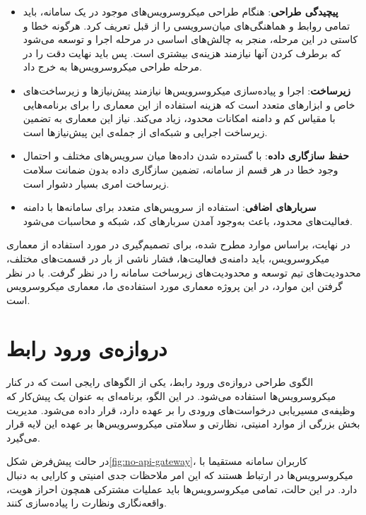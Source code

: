 \begin{itemize}
	 \item \textbf{پیچیدگی طراحی}: هنگام طراحی میکروسرویس‌های موجود در یک سامانه، باید تمامی روابط و هماهنگی‌های میان‌سرویسی را از قبل تعریف کرد. هرگونه خطا و کاستی در این مرحله، منجر به چالش‌های اساسی در مرحله اجرا و توسعه می‌شود که برطرف کردن آنها نیازمند هزینه‌ی بیشتری است. پس باید نهایت دقت را در مرحله طراحی میکروسرویس‌ها به خرج داد.
	
	 \item \textbf{زیرساخت}: اجرا و پیاده‌سازی میکروسرویس‌ها نیازمند پیش‌نیاز‌ها و زیرساخت‌های خاص و ابزار‌های متعدد است که هزینه استفاده از این معماری را برای برنامه‌هایی با مقیاس کم و دامنه امکانات محدود، زیاد می‌کند. نیاز این معماری به تضمین زیرساخت اجرایی و شبکه‌ای از جمله‌ی این پیش‌نیازها است.
	
	 \item \textbf{حفظ سازگاری داده}: با گسترده شدن داده‌ها میان سرویس‌های مختلف و احتمال وجود خطا در هر قسم از سامانه، تضمین سازگاری داده بدون ضمانت سلامت زیرساخت امری بسیار دشوار است.
	
	 \item \textbf{سربارهای اضافی}: استفاده از سرویس‌های متعدد برای سامانه‌ها با دامنه فعالیت‌های محدود، باعث به‌وجود آمدن سربار‌های کد، شبکه و محاسبات می‌شود.
\end{itemize}

در نهایت، براساس موارد مطرح شده، برای تصمیم‌گیری در مورد استفاده از معماری میکروسرویس، باید دامنه‌ی فعالیت‌ها، فشار ناشی از بار در قسمت‌های مختلف، محدودیت‌های تیم توسعه و محدودیت‌های زیرساخت سامانه را در نظر گرفت. با در نظر گرفتن این موارد، در این پروژه معماری مورد استفاده‌ی ما، معماری میکروسرویس است.

\section{‌دروازه‌ی ورود رابط}
الگوی طراحی ‌دروازه‌ی ورود رابط، یکی از الگوهای رایجی است که در کنار میکروسرویس‌ها استفاده می‌شود. در این الگو، برنامه‌ای به عنوان یک پیش‌کار که وظیفه‌ی مسیریابی درخواست‌های ورودی را بر عهده دارد، قرار داده می‌شود. مدیریت بخش بزرگی از موارد امنیتی، نظارتی و سلامتی میکروسرویس‌ها بر عهده این لایه قرار می‌گیرد.

در حالت پیش‌فرض شکل\ref{fig:no-api-gateway}، کاربران سامانه مستقیما با میکروسرویس‌ها در ارتباط هستند که این امر ملاحظات جدی امنیتی و کارایی به دنبال دارد. در این حالت، تمامی میکروسرویس‌ها باید عملیات مشترکی همچون احراز هویت، واقعه‌نگاری ونظارت را پیاده‌سازی کنند.



